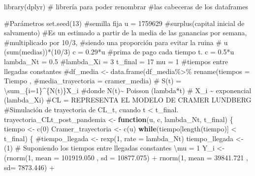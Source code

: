 \documentclass[
  us-letterpaper,
]{scrreprt}
\newenvironment{Shaded}{\begin{snugshade}}{\end{snugshade}}
\newcommand{\AttributeTok}[1]{\textcolor[rgb]{0.40,0.45,0.13}{#1}}
\newcommand{\CommentTok}[1]{\textcolor[rgb]{0.37,0.37,0.37}{#1}}
\newcommand{\ControlFlowTok}[1]{\textcolor[rgb]{0.00,0.23,0.31}{\textbf{#1}}}
\newcommand{\DecValTok}[1]{\textcolor[rgb]{0.68,0.00,0.00}{#1}}
\newcommand{\FloatTok}[1]{\textcolor[rgb]{0.68,0.00,0.00}{#1}}
\newcommand{\FunctionTok}[1]{\textcolor[rgb]{0.28,0.35,0.67}{#1}}
\newcommand{\NormalTok}[1]{\textcolor[rgb]{0.00,0.23,0.31}{#1}}
\newcommand{\OtherTok}[1]{\textcolor[rgb]{0.00,0.23,0.31}{#1}}
\newcommand{\SpecialCharTok}[1]{\textcolor[rgb]{0.37,0.37,0.37}{#1}}
\theoremstyle{plain}
\theoremstyle{plain}
\theoremstyle{definition}
\theoremstyle{remark}
\begin{document}
\begin{Shaded}
\begin{Highlighting}[]
\FunctionTok{library}\NormalTok{(dplyr) }\CommentTok{\# librería para poder renombrar }
\CommentTok{\#las cabeceras de los dataframes}

\CommentTok{\#Parámetros}
\FunctionTok{set.seed}\NormalTok{(}\DecValTok{13}\NormalTok{) }\CommentTok{\#semilla fija}
\NormalTok{u }\OtherTok{=} \DecValTok{1759629} \CommentTok{\#surplus(capital inicial de salvamento)}
\CommentTok{\#Es un estimado a partir de la media de las ganancias por semana, }
\CommentTok{\#multiplicado por 10/3, }
\CommentTok{\#siendo una proporción para evitar la ruina}
\CommentTok{\# u (sum(medias))*(10/3)}
\NormalTok{c }\OtherTok{=} \FloatTok{0.29}\SpecialCharTok{*}\NormalTok{u }\CommentTok{\#prima de pago cada tiempo t. c = 0.5*u}
\NormalTok{lambda\_Nt }\OtherTok{=} \FloatTok{0.5}
\CommentTok{\#lambda\_Xi = 3}
\NormalTok{t\_final }\OtherTok{=} \DecValTok{17}
\NormalTok{mu }\OtherTok{=} \DecValTok{1} \CommentTok{\#tiempos entre llegadas constantes}
\CommentTok{\#df\_media \textless{}{-} data.frame(df\_media\%\textgreater{}\% rename(tiempos = Tiempo , }
\CommentTok{\#media\_trayectoria = cramer\_media)}
\CommentTok{\# S(t) = \textbackslash{}sum\_\{i=1\}\^{}\{N(t)\}X\_i}
\CommentTok{\#donde N(t)\textasciitilde{} Poisson (lambda*t)}
\CommentTok{\# X\_i \textasciitilde{} exponencial (lambda\_Xi)}
\CommentTok{\#CL = REPRESENTA EL MODELO DE CRAMER LUNDBERG}
\CommentTok{\#Simulación de trayectoria de CL\_t, cuando t \textless{} t\_final.}
\NormalTok{trayectoria\_CLt\_post\_pandemia }\OtherTok{\textless{}{-}} \ControlFlowTok{function}\NormalTok{(u, c, lambda\_Nt, t\_final)}
\NormalTok{\{}
\NormalTok{  tiempo }\OtherTok{\textless{}{-}} \FunctionTok{c}\NormalTok{(}\DecValTok{0}\NormalTok{)}
\NormalTok{  Cramer\_trayectoria }\OtherTok{\textless{}{-}} \FunctionTok{c}\NormalTok{(u)}
  \ControlFlowTok{while}\NormalTok{(tiempo[}\FunctionTok{length}\NormalTok{(tiempo)] }\SpecialCharTok{\textless{}}\NormalTok{ t\_final)}
\NormalTok{  \{}
    \CommentTok{\#tiempo\_llegada \textless{}{-} rexp(1, rate = lambda\_Nt)}
\NormalTok{    tiempo\_llegada }\OtherTok{\textless{}{-}}\NormalTok{ (}\DecValTok{1}\NormalTok{) }
\CommentTok{\# Suponiendo los tiempos entre llegadas constantes \textbackslash{}mu = 1}
\NormalTok{    Y\_i }\OtherTok{\textless{}{-}}\NormalTok{  (}\FunctionTok{rnorm}\NormalTok{(}\DecValTok{1}\NormalTok{, }\AttributeTok{mean =} \FloatTok{101919.050}\NormalTok{ , }\AttributeTok{sd =} \FloatTok{10877.075}\NormalTok{)  }\SpecialCharTok{+} 
               \FunctionTok{rnorm}\NormalTok{(}\DecValTok{1}\NormalTok{, }\AttributeTok{mean =}  \FloatTok{39841.721}\NormalTok{ , }\AttributeTok{sd=} \FloatTok{7873.446}\NormalTok{)  }\SpecialCharTok{+}  

\end{Highlighting}
\end{Shaded}
\end{document}

